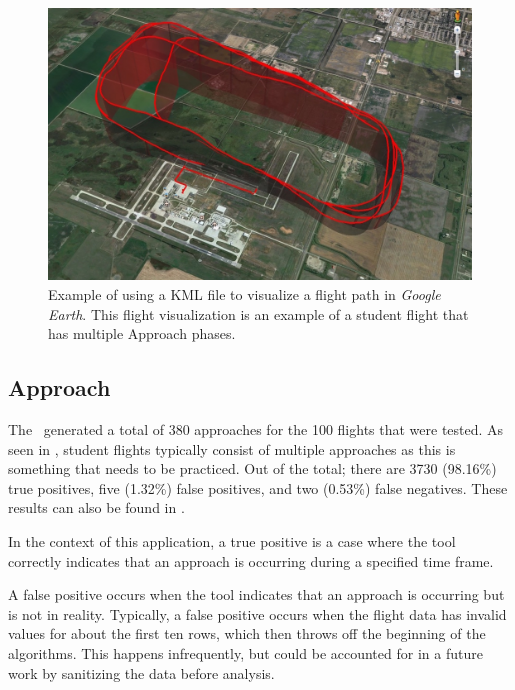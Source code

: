     \begin{figure}
    	\centering
        \includegraphics[width=\linewidth]{img/kml_example}
        \caption{Example of using a KML file to visualize a flight path in \textit{Google Earth}.  This flight visualization is an example of a student flight that has multiple Approach phases.}
        \label{fig:kml_example}
    \end{figure}
    
    
    \subsection{Approach}
    
        The \toolname\ generated a total of 380 approaches for the 100 flights that were tested. As seen in , student flights typically consist of multiple approaches as this is something that needs to be practiced.  Out of the total; there are 3730 (98.16\%) true positives, five (1.32\%) false positives, and two (0.53\%) false negatives.  These results can also be found in .
        
        In the context of this application, a true positive is a case where the tool correctly indicates that an approach is occurring during a specified time frame.
        
        A false positive occurs when the tool indicates that an approach is occurring but is not in reality.  Typically, a false positive occurs when the flight data has invalid values for about the first ten rows, which then throws off the beginning of the algorithms.  This happens infrequently, but could be accounted for in a future work by sanitizing the data before analysis.
        
